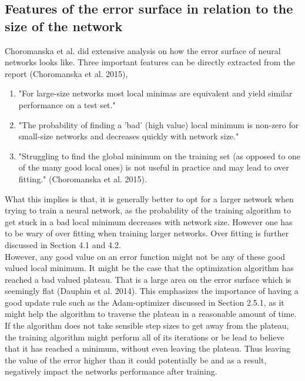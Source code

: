 \documentclass[11pt, letterpaper]{amsart}
\begin{document}
\subsection{Features of the error surface in relation to the size of the network}
Choromanska et al. did extensive analysis on how the error surface of neural networks looks like. Three important features can be directly extracted from the report (Choromanska et al. 2015),
\begin{enumerate}
\item "For large-size networks most local minimas are equivalent and yield similar performance on a test set."
\\

\item "The probability of finding a 'bad' (high value) local minimum is non-zero for small-size networks and decreases quickly with network size."
\\

\item "Struggling to find the global minimum on the training set (as opposed to one of the many good local ones) is not useful in practice and may lead to over fitting." (Choromanska et al. 2015).
\end{enumerate}
\vspace{0.5cm}

What this implies is that, it is generally better to opt for a larger network when trying to train a neural network, as the probability of the training algorithm to get stuck in a bad local minimum decreases with network size. However one has to be wary of over fitting when training larger networks. Over fitting is further discussed in Section 4.1 and 4.2.
\\

However, any good value on an error function might not be any of these good valued local minimum. It might be the case that the optimization algorithm has reached a bad valued plateau. That is a large area on the error surface which is seemingly flat (Dauphin et al. 2014). This emphasizes the importance of having a good update rule such as the Adam-optimizer discussed in Section 2.5.1, as it might help the algorithm to traverse the plateau in a reasonable amount of time. If the algorithm does not take sensible step sizes to get away from the plateau, the training algorithm might perform all of its iterations or be lead to believe that it has reached a minimum, without even leaving the plateau. Thus leaving the value of the error higher than it could potentially be and as a result, negatively impact the networks performance after training. 
\\
\end{document}
